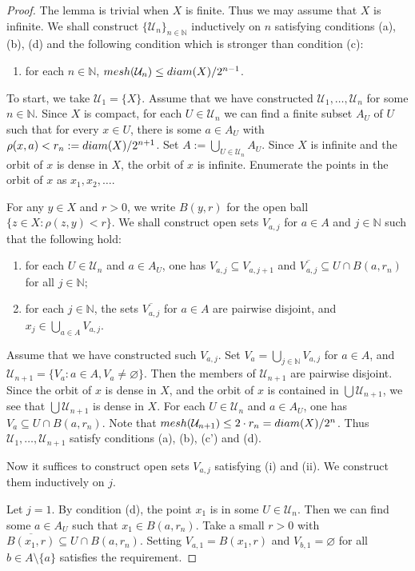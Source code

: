 \documentclass[10pt,a4paper]{amsart}
\newcommand{\Nb}{{\mathbb N}}
\newcommand{\cU}{{\mathcal U}}
\newcommand{\diam}{{\rm diam}}
\newcommand{\mesh}{{\rm mesh}}
\begin{document}
\begin{proof} The lemma is trivial when $X$ is finite. Thus we may assume that $X$ is infinite. We shall construct $\{\cU_n\}_{n\in \Nb}$ inductively on $n$ satisfying conditions (a), (b), (d) and the following condition which is stronger than condition (c):
\begin{enumerate}
\item[(c')] for each $n\in \Nb$,  ${\rm mesh}(\cU_n)\le \diam(X)/2^{n-1}$. 
\end{enumerate}

To start, we take $\cU_1=\{X\}$. Assume that we have constructed $\cU_1, \dots, \cU_n$ for some $n\in \Nb$. Since $X$ is compact, for each $U\in \cU_n$ we can find a finite subset $A_U$ of $U$ such that for every $x\in U$, there is some $a\in A_U$ with $\rho(x, a)<r_n:=\diam(X)/2^{n+1}$. Set $A:=\bigcup_{U\in \cU_n}A_U$. Since $X$ is infinite and the orbit of $x$ is dense in $X$, the orbit of $x$ is infinite. Enumerate the points in the orbit of $x$ as $x_1, x_2, \dots$. 

For any $y\in X$ and $r>0$, we write $B(y, r)$ for the open ball $\{z\in X: \rho(z, y)<r\}$. 
We shall construct open sets $V_{a, j}$ for  $a\in A$ and $j\in \Nb$ such that the following hold:
\begin{enumerate}
\item[(i)] for each $U\in \cU_n$ and $a\in A_U$, one has $V_{a, j}\subseteq V_{a, j+1}$ and $\overline{V_{a, j}}\subseteq U\cap B(a, r_n)$ for all $j\in \Nb$;
\item[(ii)] for each $j\in \Nb$, the sets $\overline{V_{a, j}}$ for $a\in A$ are pairwise disjoint, and $x_j\in \bigcup_{a\in A} V_{a, j}$. 
\end{enumerate}
Assume that we have constructed such $V_{a, j}$. Set $V_a=\bigcup_{j\in \Nb}V_{a, j}$ for $a\in A$, and $\cU_{n+1}=\{V_a: a\in A, V_a\neq \varnothing\}$. Then the members of $\cU_{n+1}$ are pairwise disjoint. Since the orbit of $x$ is dense in $X$, and the orbit of $x$ is contained in $\bigcup \cU_{n+1}$, we see that $\bigcup \cU_{n+1}$ is dense in $X$. For each $U\in \cU_n$ and $a\in A_U$, one has $V_a\subseteq U\cap B(a, r_n)$. Note that $\mesh(\cU_{n+1})\le 2\cdot r_n=\diam(X)/2^n$. Thus $\cU_1, \dots, \cU_{n+1}$ satisfy conditions (a), (b), (c') and (d).

Now it suffices to construct open sets $V_{a, j}$ satisfying (i) and (ii). We construct them inductively on $j$. 

Let $j=1$. By condition (d), the point $x_1$ is in some $U\in \cU_n$. Then we can find some $a\in A_U$ such that $x_1\in B(a, r_n)$. Take a small $r>0$ with $\overline{B(x_1, r)}\subseteq U\cap B(a, r_n)$. Setting $V_{a, 1}=B(x_1, r)$ and $V_{b, 1}=\varnothing$ for all $b\in A\setminus \{a\}$ satisfies the requirement. 


\end{proof}
\end{document}
